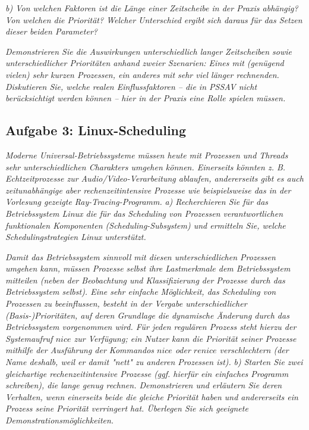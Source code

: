 \documentclass[a4paper]{article}
\begin{document}
\textit{b) Von welchen Faktoren ist die Länge einer Zeitscheibe in der Praxis abhängig? Von welchen die Priorität? Welcher Unterschied ergibt sich daraus für das Setzen dieser beiden Parameter?}
\vspace{10mm}

\textit{Demonstrieren Sie die Auswirkungen unterschiedlich langer Zeitscheiben sowie unterschiedlicher Prioritäten anhand zweier Szenarien: Eines mit (genügend vielen) sehr kurzen Prozessen, ein anderes mit sehr viel länger rechnenden. Diskutieren Sie, welche realen Einflussfaktoren – die in PSSAV nicht berücksichtigt werden können – hier in der Praxis eine Rolle spielen müssen.}


\subsection{Aufgabe 3: Linux-Scheduling}
\textit{Moderne Universal-Betriebssysteme müssen heute mit Prozessen und Threads sehr unterschiedlichen Charakters umgehen können. Einerseits könnten z. B. Echtzeitprozesse zur Audio/Video-Verarbeitung ablaufen, andererseits gibt es auch zeitunabhängige aber rechenzeitintensive Prozesse wie beispielsweise das in der Vorlesung gezeigte Ray-Tracing-Programm.}
\vspace{10mm}
\textit{a) Recherchieren Sie für das Betriebssystem Linux die für das Scheduling von Prozessen verantwortlichen funktionalen Komponenten (Scheduling-Subsystem) und ermitteln Sie, welche Schedulingstrategien Linux unterstützt.}
\vspace{10mm}

\textit{Damit das Betriebssystem sinnvoll mit diesen unterschiedlichen Prozessen umgehen kann, müssen Prozesse selbst ihre Lastmerkmale dem Betriebssystem mitteilen (neben der Beobachtung und Klassifizierung der Prozesse durch das Betriebssystem selbst). Eine sehr einfache Möglichkeit, das Scheduling von Prozessen zu beeinflussen, besteht in der Vergabe unterschiedlicher (Basis-)Prioritäten, auf deren Grundlage die dynamische Änderung durch das Betriebssystem vorgenommen wird. Für jeden regulären Prozess steht hierzu der Systemaufruf $nice$ zur Verfügung; ein Nutzer kann die Priorität seiner Prozesse mithilfe der Ausführung
    der Kommandos $nice$ oder $renice$ verschlechtern (der Name deshalb, weil er damit "nett" zu anderen Prozessen ist).}
\vspace{10mm}
\textit{b) Starten Sie zwei gleichartige rechenzeitintensive Prozesse (ggf. hierfür ein einfaches Programm schreiben), die lange genug rechnen. Demonstrieren und erläutern Sie deren Verhalten, wenn einerseits beide die gleiche Priorität haben und andererseits ein Prozess seine Priorität verringert hat. Überlegen Sie sich geeignete Demonstrationsmöglichkeiten.}
\vspace{10mm}
\end{document}
